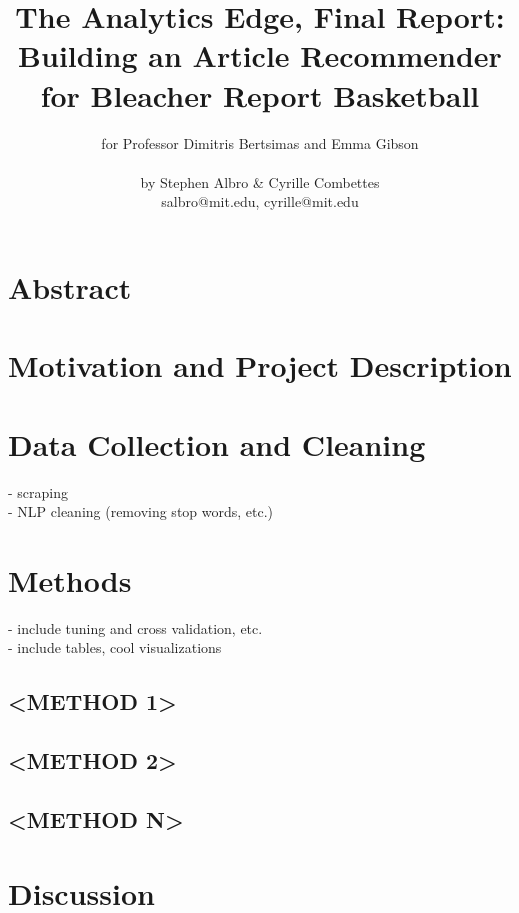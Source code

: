 \documentclass[11pt]{article}
\title{The Analytics Edge, Final Report:\\ Building an Article Recommender for Bleacher Report Basketball}
\author{for Professor Dimitris Bertsimas and Emma Gibson \text{ } \\ \\ by Stephen Albro \& Cyrille Combettes \\ salbro@mit.edu, cyrille@mit.edu}
\begin{document}
\maketitle{}


\section{Abstract}

\section{Motivation and Project Description}

\section{Data Collection and Cleaning}
- scraping \\ 
- NLP cleaning (removing stop words, etc.) \\

\section{Methods}
- include tuning and cross validation, etc. \\
- include tables, cool visualizations \\

\subsection{<METHOD 1>}

\subsection{<METHOD 2>}

\subsection{<METHOD N>}



\section{Discussion}
\end{document}

